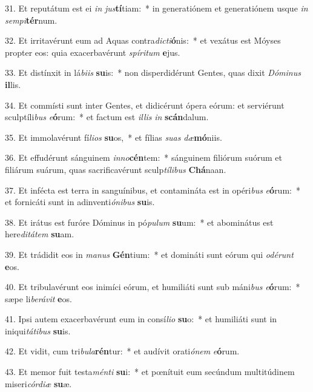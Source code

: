 31. Et reputátum est ei \textit{in} \textit{jus}\textbf{tí}tiam:~*  in generatiónem et generatiónem usque \textit{in} \textit{sem}\textit{pi}\textbf{tér}num.\

32. Et irritavérunt eum ad Aquas contra\textit{dic}\textit{ti}\textbf{ó}nis:~*  et vexátus est Móyses propter eos: quia exacerbavérunt \textit{spí}\textit{ri}\textit{tum} \textbf{e}jus.\

33. Et distínxit in lá\textit{bi}\textit{is} \textbf{su}is:~*  non disperdidérunt Gentes, quas dixit \textit{Dó}\textit{mi}\textit{nus} \textbf{il}lis.\

34. Et commísti sunt inter Gentes, et didicérunt ópera eórum: et serviérunt sculptíli\textit{bus} \textit{e}\textbf{ó}rum:~*  et factum est \textit{il}\textit{lis} \textit{in} \textbf{scán}dalum.\

35. Et immolavérunt fí\textit{li}\textit{os} \textbf{su}os,~*  et fílias \textit{su}\textit{as} \textit{dæ}\textbf{mó}niis.\

36. Et effudérunt sánguinem \textit{in}\textit{no}\textbf{cén}tem:~*  sánguinem filiórum suórum et filiárum suárum, quas sacrificavérunt sculp\textit{tí}\textit{li}\textit{bus} \textbf{Chá}naan.\

37. Et infécta est terra in sanguínibus, et contamináta est in opéri\textit{bus} \textit{e}\textbf{ó}rum:~*  et fornicáti sunt in adinventi\textit{ó}\textit{ni}\textit{bus} \textbf{su}is.\

38. Et irátus est furóre Dóminus in pó\textit{pu}\textit{lum} \textbf{su}um:~*  et abominátus est here\textit{di}\textit{tá}\textit{tem} \textbf{su}am.\

39. Et trádidit eos in \textit{ma}\textit{nus} \textbf{Gén}tium:~*  et domináti sunt eórum qui \textit{o}\textit{dé}\textit{runt} \textbf{e}os.\

40. Et tribulavérunt eos inimíci eórum, et humiliáti sunt sub máni\textit{bus} \textit{e}\textbf{ó}rum:~*  sæpe li\textit{be}\textit{rá}\textit{vit} \textbf{e}os.\

41. Ipsi autem exacerbavérunt eum in consí\textit{li}\textit{o} \textbf{su}o:~*  et humiliáti sunt in iniqui\textit{tá}\textit{ti}\textit{bus} \textbf{su}is.\

42. Et vidit, cum tri\textit{bu}\textit{la}\textbf{rén}tur:~*  et audívit orati\textit{ó}\textit{nem} \textit{e}\textbf{ó}rum.\

43. Et memor fuit testa\textit{mén}\textit{ti} \textbf{su}i:~*  et pœnítuit eum secúndum multitúdinem miseri\textit{cór}\textit{di}\textit{æ} \textbf{su}æ.\

